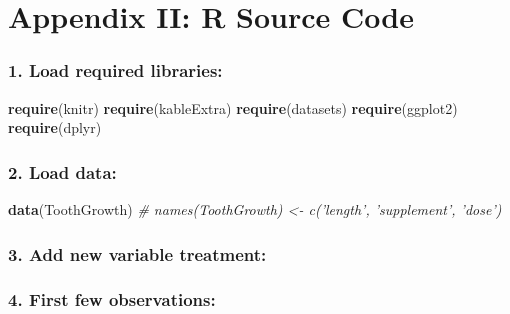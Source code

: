\documentclass[]{article}
\newenvironment{Shaded}{\begin{snugshade}}{\end{snugshade}}
\newcommand{\KeywordTok}[1]{\textcolor[rgb]{0.13,0.29,0.53}{\textbf{#1}}}
\newcommand{\DataTypeTok}[1]{\textcolor[rgb]{0.13,0.29,0.53}{#1}}
\newcommand{\StringTok}[1]{\textcolor[rgb]{0.31,0.60,0.02}{#1}}
\newcommand{\CommentTok}[1]{\textcolor[rgb]{0.56,0.35,0.01}{\textit{#1}}}
\newcommand{\OperatorTok}[1]{\textcolor[rgb]{0.81,0.36,0.00}{\textbf{#1}}}
\newcommand{\NormalTok}[1]{#1}
\begin{document}
\section{Appendix II: R Source Code}\label{appendix-ii-r-source-code}

\subsubsection{1. Load required
libraries:}\label{load-required-libraries}

\begin{Shaded}
\begin{Highlighting}[]
\KeywordTok{require}\NormalTok{(knitr)}
\KeywordTok{require}\NormalTok{(kableExtra)}
\KeywordTok{require}\NormalTok{(datasets)}
\KeywordTok{require}\NormalTok{(ggplot2)}
\KeywordTok{require}\NormalTok{(dplyr)}
\end{Highlighting}
\end{Shaded}

\subsubsection{2. Load data:}\label{load-data}

\begin{Shaded}
\begin{Highlighting}[]
\KeywordTok{data}\NormalTok{(ToothGrowth)}
\CommentTok{# names(ToothGrowth) <- c('length', 'supplement', 'dose')}
\end{Highlighting}
\end{Shaded}

\subsubsection{3. Add new variable
treatment:}\label{add-new-variable-treatment}

\begin{Shaded}
\end{Shaded}

\subsubsection{4. First few observations:}\label{first-few-observations}
\end{document}
